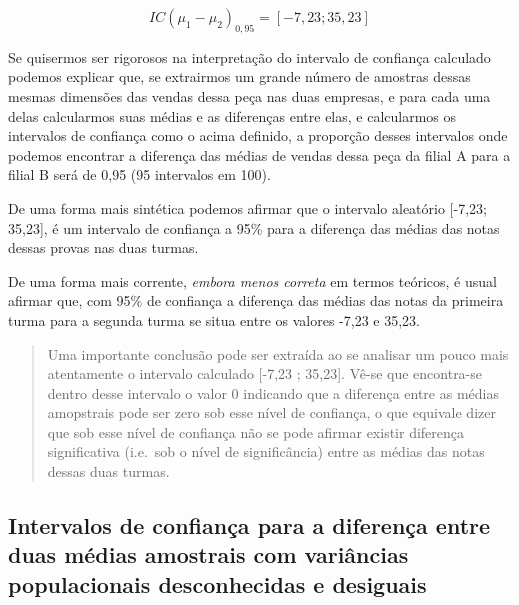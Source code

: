 \documentclass[
]{book}
\begin{document}
\hfill\break

\[
IC (\mu_{1} - \mu_{2})_{0,95} = [-7,23; 35,23 ]
\]

\hfill\break

Se quisermos ser rigorosos na interpretação do intervalo de confiança calculado podemos explicar que, se extrairmos um grande número de amostras dessas mesmas dimensões das vendas dessa peça nas duas empresas, e para cada uma delas calcularmos suas médias e as diferenças entre elas, e calcularmos os intervalos de confiança como o acima definido, a proporção desses intervalos onde podemos encontrar a diferença das médias de vendas dessa peça da filial A para a filial B será de 0,95 (95 intervalos em 100).

\hfill\break

De uma forma mais sintética podemos afirmar que o intervalo aleatório {[}-7,23; 35,23{]}, é um intervalo de confiança a 95\% para a diferença das médias das notas dessas provas nas duas turmas.

\hfill\break

De uma forma mais corrente, \emph{embora menos correta} em termos teóricos, é usual afirmar que, com 95\% de confiança a diferença das médias das notas da primeira turma para a segunda turma se situa entre os valores -7,23 e 35,23.

\hfill\break

\begin{quote}
Uma importante conclusão pode ser extraída ao se analisar um pouco mais atentamente o intervalo calculado {[}-7,23 ; 35,23{]}. Vê-se que encontra-se dentro desse intervalo o valor 0 indicando que a diferença entre as médias amopstrais pode ser zero sob esse nível de confiança, o que equivale dizer que sob esse nível de confiança não se pode afirmar existir diferença significativa (i.e.~sob o nível de significância) entre as médias das notas dessas duas turmas.
\end{quote}

\hfill\break

\hypertarget{intervalos-de-confianuxe7a-para-a-diferenuxe7a-entre-duas-muxe9dias-amostrais-com-variuxe2ncias-populacionais-desconhecidas-e-desiguais}{%
\subsection{Intervalos de confiança para a diferença entre duas médias amostrais com variâncias populacionais desconhecidas e desiguais}\label{intervalos-de-confianuxe7a-para-a-diferenuxe7a-entre-duas-muxe9dias-amostrais-com-variuxe2ncias-populacionais-desconhecidas-e-desiguais}}
\end{document}
